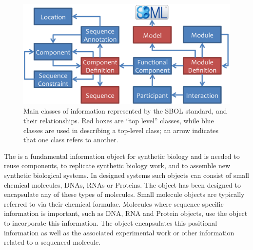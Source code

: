 \begin{figure}[ht]
\begin{center}
\includegraphics[scale=1.2]{images/SBOL2_2_revised.png}
\caption{Main classes of information represented by the SBOL standard, and their relationships.  Red boxes are ``top level'' classes, while blue classes are used in describing a top-level class; an arrow indicates that one class refers to another.}
\label{images:overview}
\end{center}
\end{figure}

The  is a fundamental information object for synthetic biology and is needed to reuse components, to replicate synthetic biology work, and to assemble new synthetic biological systems. In designed systems such objects can consist of small chemical molecules, DNAs, RNAs or Proteins. The  object has been designed to encapsulate any of these types of molecules. Small molecule  objects are typically referred to via their chemical formulae. Molecules where sequence specific information is important, such as DNA, RNA and Protein  objects, use the object to incorporate this information. The  object encapsulates this positional information as well as the associated experimental work or other information related to a sequenced molecule.


